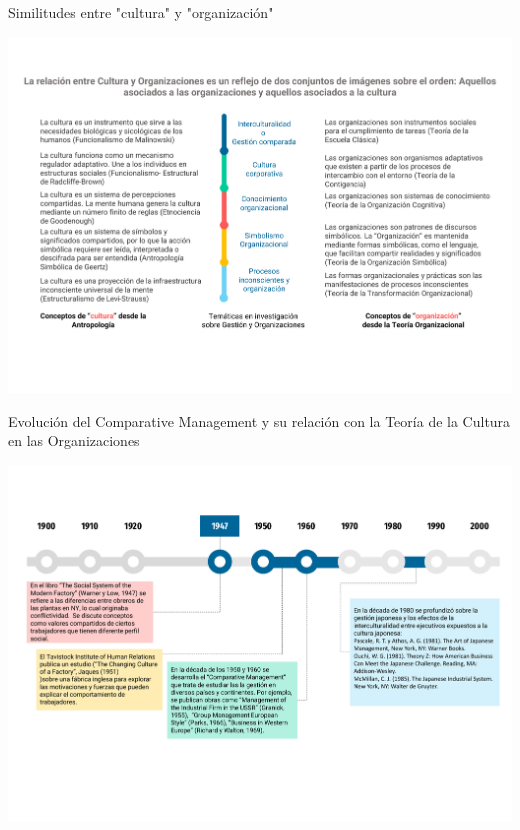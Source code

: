 \documentclass[aspectratio=169]{beamer}
\begin{document}
	\begin{frame}{Similitudes entre "cultura" y "organización"}
		\begin{center}
			\includegraphics[height=\textheight]{./figures/L3.pdf}
		\end{center}
	\end{frame}

	\begin{frame}{Evolución del Comparative Management y su relación con la Teoría de la Cultura en las Organizaciones}
		\begin{center}
			\includegraphics[height=\textheight]{./figures/L4.pdf}
		\end{center}
	\end{frame}
\end{document}
